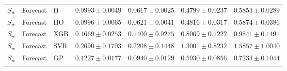 \begin{table}[t]
\begin{tabular}{@{}cllcccc@{}}
\addlinespace[1pt]
$S_w$ & Forecast & H & $0.0993\pm0.0049$ & $0.0617\pm0.0025$ & $0.4799\pm0.0237$ & $0.5853\pm0.0289$ \\
$S_w$ & Forecast & HO & $0.0996\pm0.0065$ & $0.0621\pm0.0041$ & $0.4816\pm0.0317$ & $0.5874\pm0.0386$ \\
$S_w$ & Forecast & XGB & $0.1669\pm0.0253$ & $0.1400\pm0.0275$ & $0.8069\pm0.1222$ & $0.9841\pm0.1491$ \\
$S_w$ & Forecast & SVR & $0.2690\pm0.1703$ & $0.2208\pm0.1448$ & $1.3001\pm0.8232$ & $1.5857\pm1.0040$ \\
$S_w$ & Forecast & GP & $0.1227\pm0.0177$ & $0.0940\pm0.0129$ & $0.5930\pm0.0856$ & $0.7233\pm0.1044$ \\
\addlinespace[1pt]
\bottomrule
\end{tabular}
\end{table}
